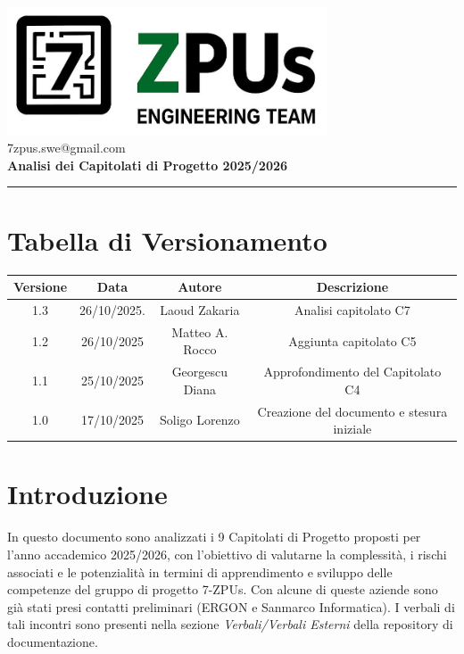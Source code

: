 \documentclass[a4paper,12pt]{article}
\begin{document}
\begin{center}
    \includegraphics[width=9.5cm]{../assets/logo7ZPUs.jpg}\\
    \small\hspace{10cm} 7zpus.swe@gmail.com\\
    \vspace{0.5cm}
    \Large \textbf{Analisi dei Capitolati di Progetto 2025/2026}\\
\end{center}

\vspace{0.3cm}
\hrule
\vspace{0.5cm}

\tableofcontents

\newpage

\section*{Tabella di Versionamento}
\begin{tabular}{|c|c|c|c|}
    \hline
    \textbf{Versione} & \textbf{Data} & \textbf{Autore} & \textbf{Descrizione}\\
    \hline
    1.3               & 26/10/2025.   & Laoud Zakaria    & Analisi capitolato C7\\
    \hline
    1.2               & 26/10/2025    & Matteo A. Rocco  & Aggiunta capitolato C5 \\
    \hline
    1.1 & 25/10/2025 & Georgescu Diana & Approfondimento del Capitolato C4 \\
    \hline
    1.0               & 17/10/2025    & Soligo Lorenzo  & Creazione del documento e stesura iniziale \\
    \hline

\end{tabular}

\section{Introduzione}
In questo documento sono analizzati i 9 Capitolati di Progetto proposti per
l'anno accademico 2025/2026, con l'obiettivo di valutarne la complessità, i
rischi associati e le potenzialità in termini di apprendimento e sviluppo delle
competenze del gruppo di progetto 7-ZPUs. Con alcune di queste aziende sono già
stati presi contatti preliminari (ERGON e Sanmarco Informatica). I verbali di
tali incontri sono presenti nella sezione \textit{Verbali/Verbali Esterni}
della repository di documentazione. \vspace{0.5cm}
\end{document}
